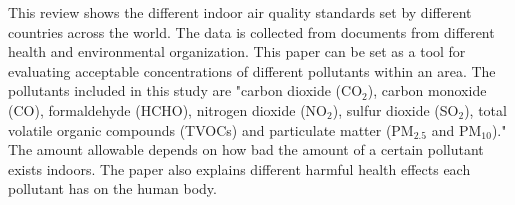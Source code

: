This review shows the different indoor air quality standards set by different countries across the world. The data is collected from documents from different health and environmental organization. This paper can be set as a tool for evaluating acceptable concentrations of different pollutants within an area. The pollutants included in this study are "carbon dioxide (CO$_{2}$), carbon monoxide (CO), formaldehyde (HCHO), nitrogen dioxide (NO$_{2}$), sulfur dioxide (SO$_{2}$), total volatile organic compounds (TVOCs) and particulate matter (PM$_{2.5}$ and PM$_{10}$)." The amount allowable depends on how bad the amount of a certain pollutant exists indoors. The paper also explains different harmful health effects each pollutant has on the human body.
 
  






